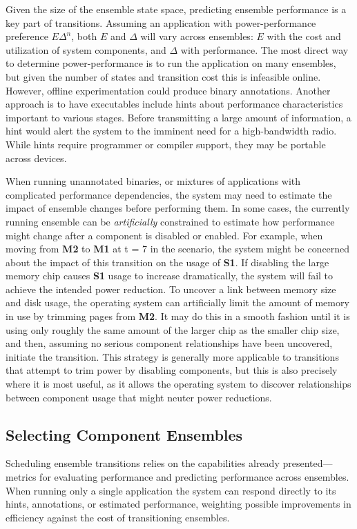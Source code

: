 Given the size of the ensemble state space, predicting ensemble performance
is a key part of transitions. Assuming an application with power-performance
preference $E\Delta^n$, both $E$ and $\Delta$ will vary across ensembles: $E$
with the cost and utilization of system components, and $\Delta$ with
performance. The most direct way to determine power-performance is to run the
application on many ensembles, but given the number of states and transition
cost this is infeasible online. However, offline experimentation could
produce binary annotations. Another approach is to have executables include
hints about performance characteristics important to various stages. Before
transmitting a large amount of information, a hint would alert the system to
the imminent need for a high-bandwidth radio. While hints require programmer
or compiler support, they may be portable across devices.

When running unannotated binaries, or mixtures of applications with
complicated performance dependencies, the system may need to estimate the
impact of ensemble changes before performing them. In some cases, the
currently running ensemble can be \textit{artificially} constrained to
estimate how performance might change after a component is disabled or
enabled. For example, when moving from \textbf{M2} to \textbf{M1} at t = 7 in
the scenario, the system might be concerned about the impact of this
transition on the usage of \textbf{S1}. If disabling the large memory chip
causes \textbf{S1} usage to increase dramatically, the system will fail to
achieve the intended power reduction. To uncover a link between memory size
and disk usage, the operating system can artificially limit the amount of
memory in use by trimming pages from \textbf{M2}. It may do this in a smooth
fashion until it is using only roughly the same amount of the larger chip as
the smaller chip size, and then, assuming no serious component relationships
have been uncovered, initiate the transition. This strategy is generally more
applicable to transitions that attempt to trim power by disabling components,
but this is also precisely where it is most useful, as it allows the
operating system to discover relationships between component usage that might
neuter power reductions.

\subsection{Selecting Component Ensembles}
\label{subsec-select}

Scheduling ensemble transitions relies on the capabilities already
presented---metrics for evaluating performance and predicting performance
across ensembles. When running only a single application the system can
respond directly to its hints, annotations, or estimated performance,
weighting possible improvements in efficiency against the cost of
transitioning ensembles.

